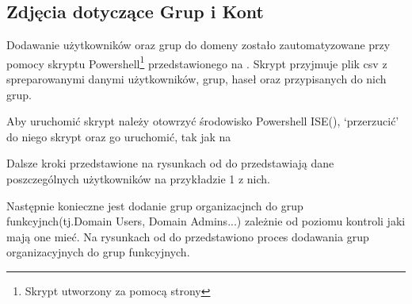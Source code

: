 
\subsection{Zdjęcia dotyczące Grup i Kont}

Dodawanie użytkowników oraz grup do domeny zostało zautomatyzowane przy pomocy skryptu Powershell\footnote{Skrypt utworzony za pomocą strony\cite{Powershell}} przedstawionego na . Skrypt przyjmuje plik csv z spreparowanymi danymi użytkowników, grup, haseł oraz przypisanych do nich grup.

\clearpage	
{}


\clearpage

Aby uruchomić skrypt należy otowrzyć środowisko Powershell ISE(), `przerzucić' do niego skrypt oraz go uruchomić, tak jak na 

\clearpage


\clearpage

Dalsze kroki przedstawione na rysunkach od  do  przedstawiają dane poszczególnych użytkowników na przykładzie 1 z nich.



\clearpage


\clearpage


\clearpage


\clearpage

Następnie konieczne jest dodanie grup organizacjnch do grup funkcyjnch(tj.Domain Users, Domain Admins...) zależnie od poziomu kontroli jaki mają one mieć. Na rysunkach od  do  przedstawiono proces dodawania grup organizacyjnych do grup funkcyjnych.

